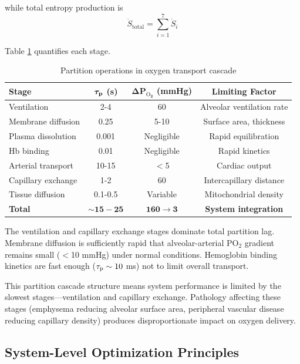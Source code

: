 while total entropy production is
\begin{equation}
\dot{S}_{\mathrm{total}} = \sum_{i=1}^{7} \dot{S}_{i}
\end{equation}

Table \ref{tab:integrated_partition} quantifies each stage.

\begin{table}[h]
\centering
\caption{Partition operations in oxygen transport cascade}
\label{tab:integrated_partition}
\begin{tabular}{lccc}
\toprule
\textbf{Stage} & \textbf{$\boldsymbol{\tau_{\mathrm{p}}}$ (s)} & \textbf{$\boldsymbol{\Delta P_{\mathrm{O}_{2}}}$ (mmHg)} & \textbf{Limiting Factor} \\
\midrule
Ventilation & 2-4 & 60 & Alveolar ventilation rate \\
Membrane diffusion & 0.25 & 5-10 & Surface area, thickness \\
Plasma dissolution & 0.001 & Negligible & Rapid equilibration \\
Hb binding & 0.01 & Negligible & Rapid kinetics \\
Arterial transport & 10-15 & $<$5 & Cardiac output \\
Capillary exchange & 1-2 & 60 & Intercapillary distance \\
Tissue diffusion & 0.1-0.5 & Variable & Mitochondrial density \\
\midrule
\textbf{Total} & $\mathbf{\sim 15-25}$ & $\mathbf{160 \to 3}$ & \textbf{System integration} \\
\bottomrule
\end{tabular}
\end{table}

The ventilation and capillary exchange stages dominate total partition lag. Membrane diffusion is sufficiently rapid that alveolar-arterial PO$_{2}$ gradient remains small ($<$10 mmHg) under normal conditions. Hemoglobin binding kinetics are fast enough ($\tau_{\mathrm{p}} \sim 10$ ms) not to limit overall transport.

This partition cascade structure means system performance is limited by the slowest stages—ventilation and capillary exchange. Pathology affecting these stages (emphysema reducing alveolar surface area, peripheral vascular disease reducing capillary density) produces disproportionate impact on oxygen delivery.

\subsection{System-Level Optimization Principles}

